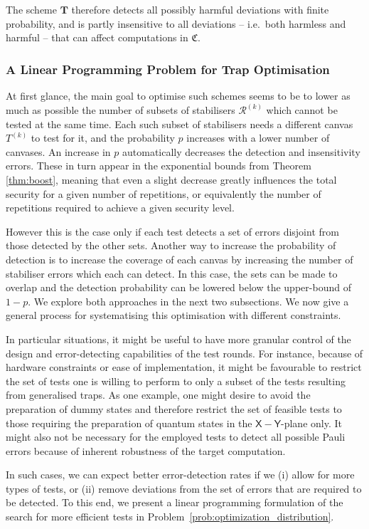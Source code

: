 \documentclass[12pt]{iopart}
\newcommand{\cptp}[1]{\mathsf{#1}} \newcommand{\pd}[1]{\mathcal{#1}}  \newcommand{\sch}[1]{\bm{#1}}
\newcommand{\X}{\cptp{X}}
\newcommand{\Y}{\cptp{Y}}
\renewcommand{\1}{\mathds{1}}
\begin{document}
The scheme $\sch T$ therefore detects all possibly harmful deviations with finite
probability, and is partly insensitive to all deviations -- i.e.~both
harmless and harmful -- that can affect computations in $\mathfrak C$.

\subsubsection{A Linear Programming Problem for Trap Optimisation}
\label{app:lin-prog}
At first glance, the main goal to optimise 
such schemes seems to be to lower as much as possible the number of subsets of stabilisers $\mathcal R^{(k)}$ which
cannot be tested at the same time. Each such subset of stabilisers needs a 
different canvas $T^{(k)}$ to test for it, and the probability $p$ increases with a lower number of canvases.
An increase in $p$ automatically decreases the detection and insensitivity errors. These in turn
appear in the exponential bounds from Theorem \ref{thm:boost}, meaning that even a slight decrease
greatly influences the total security for a given number of repetitions, or equivalently the number of 
repetitions required to achieve a given security level.

However this is the case only if each test detects a set of errors disjoint from those detected by the other sets. Another way to increase the probability of detection
is to increase the coverage of each canvas by increasing the number of stabiliser errors which each can detect.
In this case, the sets can be made to overlap and the detection probability can be lowered below the upper-bound of $1-p$. We explore both approaches in the next two subsections. We now give a general process for systematising this optimisation with different constraints.

In particular situations, it might be useful to have more granular control of the design and error-detecting capabilities of the test rounds.
For instance, because of hardware constraints or ease of implementation, it might be favourable to restrict the set of tests one is willing to perform to only a subset of the tests resulting from generalised traps. As one example, one might desire to avoid the preparation of dummy states and therefore restrict the set of feasible tests to those requiring the preparation of quantum states in the $\X-\Y$-plane only. It might also not be necessary for the employed tests to detect all possible Pauli errors because of inherent robustness of the target computation.

In such cases, we can expect better error-detection rates if we (i) allow for more types of tests, or (ii) remove deviations from the set of errors that are required to be detected. To this end, we present a linear programming formulation of the search for more efficient tests in Problem~\ref{prob:optimization_distribution}.
\end{document}
